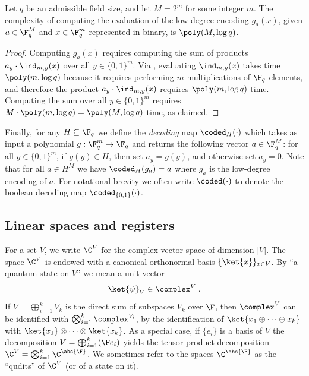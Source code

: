 \begin{lemma}
\label{lem:ld-encoding-complexity}
Let $q$ be an admissible field size, and let $M = 2^m$ for some integer $m$.
The complexity of computing the evaluation of the low-degree encoding $g_a(x)$,
given $a \in \F_q^M$ and $x \in \F_q^m$ represented in binary, is $\poly(M,\log
q)$.
\end{lemma}
\begin{proof}
	Computing $g_a(x)$ requires computing the sum of products $a_y \cdot
  \ind_{m,y}(x)$ over all $y \in \{0,1\}^m$.
  Via , evaluating $\ind_{m,y}(x)$ takes time
  $\poly(m,\log q)$ because it requires performing $m$ multiplications of $\F_q$
  elements, and therefore the product $a_y \cdot \ind_{m,y}(x)$ requires
  $\poly(m,\log q)$ time.
  Computing the sum over all $y \in \{0,1\}^m$ requires $M \cdot \poly(m,\log q)
  = \poly(M,\log q)$ time, as claimed.
\end{proof}

Finally, for any $H \subseteq \F_q$ we define the \emph{decoding} map
$\coded_H(\cdot)$ which takes as input a polynomial $g : \F_q^m \to \F_q$ and
returns the following vector $a \in \F_q^M$: for all $y \in \{0,1\}^m$, if $g(y)
\in H$, then set $a_y = g(y)$, and otherwise set $a_y = 0$.
Note that for all $a \in H^M$ we have $\coded_H(g_a) = a$ where $g_a$ is the
low-degree encoding of $a$.
For notational brevity we often write $\coded(\cdot)$ to denote the boolean
decoding map $\coded_{\{0,1\}}(\cdot)$.

\subsection{Linear spaces and registers}
\label{sec:lin-reg}

For a set $V$, we write $\C^V$ for the complex vector space of dimension $|V|$.
The space $\C^V$ is endowed with a canonical orthonormal basis
$\{\ket{x}\}_{x\in V}$.
By ``a quantum state on $V$'' we mean a unit vector
\begin{equation*}
  \ket{\psi}_V \in \complex^V\;.
\end{equation*}
If $V = \bigoplus_{i=1}^k V_k$ is the direct sum of subspaces $V_k$ over $\F$,
then $\complex^V$ can be identified with $\bigotimes_{i=1}^k
\complex^{V_i}$, by the identification of $\ket{x_1 \oplus \dots \oplus
  x_k}$ with $\ket{x_1} \otimes \dots \otimes \ket{x_k}$.
As a special case, if $\{e_i\}$ is a basis of $V$ the decomposition $V =
\bigoplus_{i=1}^k ( \F e_i)$ yields the tensor product decomposition $\C^V =
\bigotimes_{i=1}^k \C^{\abs{\F}}$.
We sometimes refer to the spaces $\C^{\abs{\F}}$ as the ``qudits'' of $\C^V$ (or
of a state on it).

